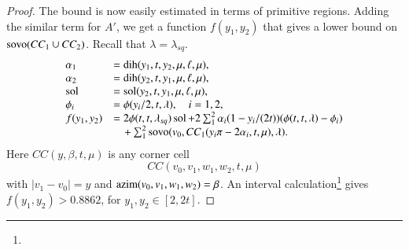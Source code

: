 \begin{proof}
The bound is now easily estimated in terms of primitive
regions.  Adding the similar
term for $A'$, we get
a function $f(y_1,y_2)$ that gives a lower bound on 
${\operatorname{sovo}}(CC_1\cup CC_2)$.  Recall that $\lambda=\lambda_{sq}$.
    $$
    \begin{array}{lll}
    \alpha_1 &= \operatorname{dih}(y_1,t,y_2,\mu,\ell,\mu),\\
    \alpha_2 &= \operatorname{dih}(y_2,t,y_1,\mu,\ell,\mu),\\
    \operatorname{sol} &= \operatorname{sol}(y_2,t,y_1,\mu,\ell,\mu),\\
    \phi_i &= \phi(y_i/2,t,\lambda),\quad i=1,2,\\
    f(y_1,y_2)&=
    2\phi(t,t,\lambda_{sq})\operatorname{sol}+
    2\sum_1^2 \alpha_i(1-y_i/(2t))(\phi(t,t,\lambda)-\phi_i)\\
        &\quad +
       \sum_1^2 {\operatorname{sovo}}(v_0,CC_1(y_i\pi-2\alpha_i,t,\mu),\lambda).
    \end{array}
    $$
Here $CC(y,\beta,t,\mu)$ is any corner cell
$$CC(v_0,v_1,w_1,w_2,t,\mu)$$ with $|v_1-v_0|=y$ and
${\operatorname{azim}}(v_0,v_1,w_1,w_2)=\beta$.
An interval calculation\footnote{} %
gives $f(y_1,y_2)>0.8862$, for $y_1,y_2\in[2,2t]$.
\end{proof}








